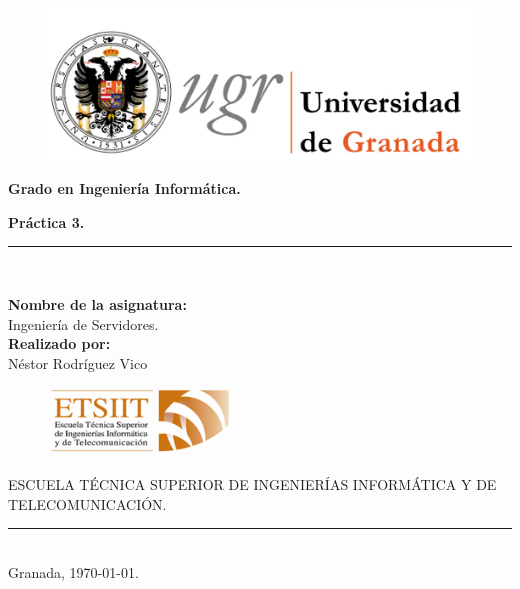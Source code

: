 \documentclass[a4paper,titlepage,12pt]{scrartcl}	%
\numberwithin{figure}{section} %
\numberwithin{table}{section} %
\begin{document}
	\begin{titlepage}
		\begin{center}
			\begin{figure}[htb]
				\begin{center}
					\includegraphics[width=12cm]{./Portada/ugr.png}
				\end{center}
			\end{figure}

			\vspace*{0.8cm}
			\begin{Large}
				\textbf{Grado en Ingeniería Informática.}\\
			\end{Large}
			\begin{Huge}
				\vspace{1.5cm}
				\textbf{Práctica 3.} \\
			\end{Huge}
			\vspace*{0.76cm}
			\rule{100mm}{0.1mm}\\
			\vspace*{0.5cm}
			\begin{large}
				\textbf{Nombre de la asignatura:}\\
				Ingeniería de Servidores.\\
				\vspace*{0.5cm}
				\textbf{Realizado por:}\\
				Néstor Rodríguez Vico \\

				\vspace*{2cm}
				\begin{figure}[htb]
					\begin{center}
						\includegraphics[width=5cm]{./Portada/etsiit.png}
					\end{center}
				\end{figure}
				\vspace*{-0.6cm}
				ESCUELA TÉCNICA SUPERIOR DE INGENIERÍAS INFORMÁTICA Y DE TELECOMUNICACIÓN.\\
				\rule{20mm}{0.1mm}\\
				\vspace*{0.6cm}
				Granada, \today.
			\end{large}
		\end{center}
	\end{titlepage}
	
\end{document}

